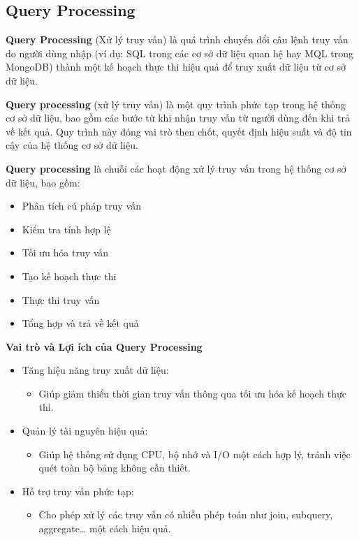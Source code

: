 \subsection{Query Processing}

\textbf{Query Processing} (Xử lý truy vấn) là quá trình chuyển đổi câu lệnh truy vấn do người dùng nhập (ví dụ: SQL trong các cơ sở dữ liệu quan hệ hay MQL trong MongoDB) thành một kế hoạch thực thi hiệu quả để truy xuất dữ liệu từ cơ sở dữ liệu. 

\textbf{Query processing} (xử lý truy vấn) là một quy trình phức tạp trong hệ thống cơ sở dữ liệu, bao gồm các bước từ khi nhận truy vấn từ người dùng đến khi trả về kết quả. Quy trình này đóng vai trò then chốt, quyết định hiệu suất và độ tin cậy của hệ thống cơ sở dữ liệu.

\textbf{Query processing} là chuỗi các hoạt động xử lý truy vấn trong hệ thống cơ sở dữ liệu, bao gồm:

\begin{itemize}
    \item Phân tích cú pháp truy vấn
    \item Kiểm tra tính hợp lệ
    \item Tối ưu hóa truy vấn
    \item Tạo kế hoạch thực thi
    \item Thực thi truy vấn
    \item Tổng hợp và trả về kết quả
\end{itemize}

\noindent
\textbf{Vai trò và Lợi ích của Query Processing}

\begin{itemize}
    \item Tăng hiệu năng truy xuất dữ liệu:
    \begin{itemize}
        \item Giúp giảm thiểu thời gian truy vấn thông qua tối ưu hóa kế hoạch thực thi.
    \end{itemize}
    \item Quản lý tài nguyên hiệu quả:
    \begin{itemize}
        \item Giúp hệ thống sử dụng CPU, bộ nhớ và I/O một cách hợp lý, tránh việc quét toàn bộ bảng không cần thiết.
    \end{itemize}
    \item Hỗ trợ truy vấn phức tạp:
    \begin{itemize}
        \item Cho phép xử lý các truy vấn có nhiều phép toán như join, subquery, aggregate… một cách hiệu quả.
    \end{itemize}
\end{itemize}

